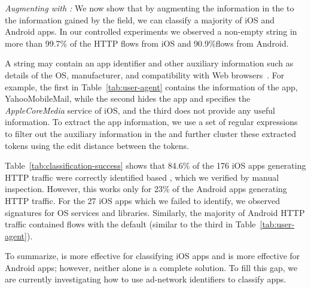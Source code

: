 \emph{Augmenting with \useragent: } We now show that by augmenting the information in the \useragent to the information gained by the \httphost field, we can classify a majority of iOS and Android apps. 
In our controlled experiments we observed a non-empty \useragent string in more than 99.7\% of the HTTP flows from iOS and 90.9\%flows from Android. 

A \useragent string may contain an app identifier and other auxiliary information such as details of the OS, manufacturer, and compatibility with Web browsers~\cite{mozilla:useragentdetection}. 
For example, the first \useragent in Table~\ref{tab:user-agent} contains the information of the app, YahooMobileMail, while the second \useragent hides the app and specifies the \emph{AppleCoreMedia} service of iOS, and the third does not provide any useful information. 
To extract the app information, we use a set of regular expressions to filter out the auxiliary information in the \useragent and further cluster these extracted tokens using the edit distance between the tokens.%

Table~\ref{tab:classification-success} shows that 84.6\% of the 176 iOS apps generating HTTP traffic were correctly identified based \useragent, which we verified by manual inspection.
However, this works only for 23\% of the Android apps generating HTTP traffic. 
For the 27 iOS apps which we failed to identify, we observed signatures for OS services and libraries.
Similarly, the majority of Android HTTP traffic contained flows with the default \useragent (similar to the third \useragent in Table~\ref{tab:user-agent}).

To summarize, \useragent is more effective for classifying iOS apps and \httphost is more effective for Android apps; however, neither alone is a complete 
solution. To fill this gap, we are currently investigating how to use ad-network identifiers to classify apps. 

